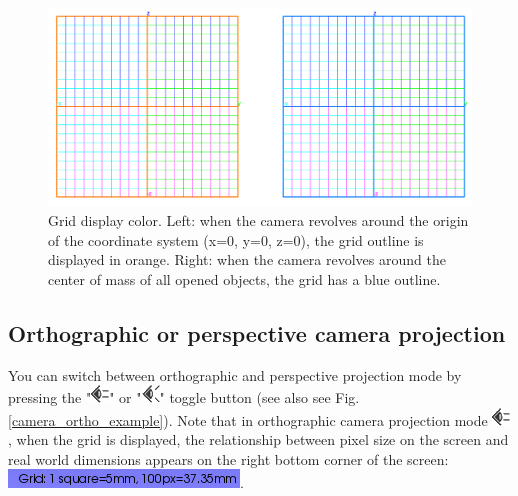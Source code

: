 \begin{figure}
  \centering
  \includegraphics[scale=0.4]{images/06/camera/grids.png} 
	\caption{Grid display color. Left: when the camera revolves around the origin of the coordinate system (x=0, y=0, z=0), the grid outline is displayed in orange. Right: when the camera revolves around the center of mass of all opened objects, the grid has a blue outline.}
\label{grid_color}
 
\end{figure}

 
\subsection{Orthographic or perspective camera projection}
You can switch between orthographic and perspective projection mode by pressing the "\includegraphics[scale=0.4]{images/06/camera/camera_ortho.png}" or "\includegraphics[scale=0.7]{images/06/camera/camera_persp}" toggle button (see also see Fig. \ref{camera_ortho_example}).
Note that in orthographic camera projection mode \includegraphics[scale=0.7]{images/06/camera/camera_ortho.png}, when the grid is displayed, the relationship between pixel size on the screen and real world dimensions appears on the right bottom corner of the screen: \includegraphics[scale=0.7]{images/06/camera/grid_infos.png}. 

